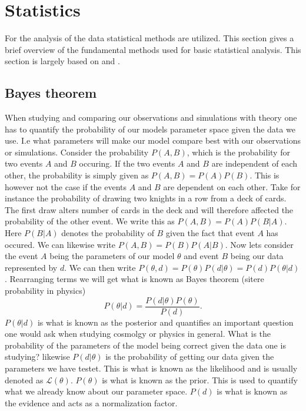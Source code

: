 \section{Statistics}
For the analysis of the data statistical methods are utilized. This section
gives a brief overview of the fundamental methods used for basic statistical analysis.
This section is largely based on \cite{Probphysics} and \cite{Dataanalysiscosmology}.
\subsection{Bayes theorem}
When studying and comparing our observations and simulations with theory one has
to quantify the probability of our models parameter space given the data we use.
I.e what parameters will make our model compare best with our observations or
simulations. Consider the probability $P(A, B)$, which is the probability for two events $A$ and $B$ occuring.
If the two events $A$ and $B$ are independent of each other, the probability is simply given as $P(A, B) = P(A)P(B)$.
This is however not the case if the events $A$ and $B$ are dependent on each other. Take for instance the probability
of drawing two knights in a row from a deck of cards. The first draw alters number of cards in the deck and will therefore affected
the probability of the other event. We write this as $P(A,B) = P(A)P(B\vert A)$. Here $P(B\vert A)$ denotes the probability of $B$ given the fact that 
event $A$ has occured. We can likewise write $P(A,B) = P(B)P(A\vert B)$. Now lets consider the event $A$ being the parameters of our model $\theta$ and
event $B$ being our data represented by $d$. We can then write $P(\theta,d) = P(\theta)P(d\vert \theta)=P(d)P(\theta\vert d)$. Rearranging terms we will get
what is known as Bayes theorem (sitere probability in physics)
\begin{equation}\label{eq:bayes}
    P(\theta\vert d) = \frac{P(d\vert \theta)P(\theta)}{P(d)}.
\end{equation}
$P(\theta\vert d)$ is what is known as the posterior and quantifies an
important question one would ask when studying cosmolgy or physics in general. What is the probability
of the parameters of the model being correct given the data one is studying? likewise $P(d\vert\theta)$ is the
probability of getting our data given the parameters we have testet. This is what is known as
the likelihood and is usually denoted as $\mathcal{L}(\theta)$. $P(\theta)$ is what is
known as the prior. This is used to quantify what we already know about our
parameter space. $P(d)$ is what is known as the evidence and acts as a
normalization factor. \\

